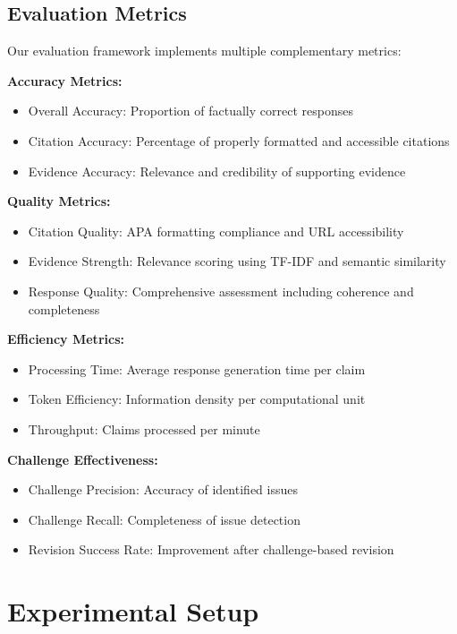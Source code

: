 \documentclass[11pt,a4paper]{article}
\begin{document}
\subsection{Evaluation Metrics}

Our evaluation framework implements multiple complementary metrics:

\textbf{Accuracy Metrics:}
\begin{itemize}
    \item Overall Accuracy: Proportion of factually correct responses
    \item Citation Accuracy: Percentage of properly formatted and accessible citations
    \item Evidence Accuracy: Relevance and credibility of supporting evidence
\end{itemize}

\textbf{Quality Metrics:}
\begin{itemize}
    \item Citation Quality: APA formatting compliance and URL accessibility
    \item Evidence Strength: Relevance scoring using TF-IDF and semantic similarity
    \item Response Quality: Comprehensive assessment including coherence and completeness
\end{itemize}

\textbf{Efficiency Metrics:}
\begin{itemize}
    \item Processing Time: Average response generation time per claim
    \item Token Efficiency: Information density per computational unit
    \item Throughput: Claims processed per minute
\end{itemize}

\textbf{Challenge Effectiveness:}
\begin{itemize}
    \item Challenge Precision: Accuracy of identified issues
    \item Challenge Recall: Completeness of issue detection
    \item Revision Success Rate: Improvement after challenge-based revision
\end{itemize}

\section{Experimental Setup}
\end{document}
